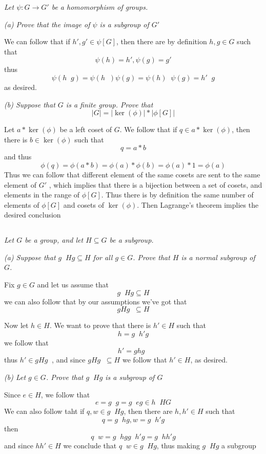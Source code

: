 \documentclass[11pt,oneside,titlepage]{book}
\DeclareMathOperator \inv {^{-1}}
\begin{document}
\textit{Let $\psi: G \to G'$ be a homomorphism of groups.}

\textit{(a) Prove that the image of $\psi$ is a subgroup of $G'$}

We can follow that if $h', g' \in \psi[G]$, then there are by
definition $h, g \in G$ such that
$$\psi(h) = h', \psi(g) = g'$$
thus
$$\psi(h\inv g) = \psi(h\inv) \psi(g) = \psi(h)\inv \psi(g) = h'\inv g$$
as desired.

\textit{(b) Suppose that $G$ is a finite group. Prove that
  $$|G| = |\ker(\phi)| * |\phi[G]|$$}

Let $a * \ker(\phi)$ be a left coset of $G$. We follow that if $q \in
a * \ker(\phi)$, then there is $b \in \ker(\phi)$ such that
$$q = a * b$$
and thus
$$\phi(q) = \phi(a * b) = \phi(a) * \phi(b) = \phi(a) * 1 = \phi(a)$$
Thus we can follow that different element of the same cosets are sent
to the same element of $G'$ , which implies that there is a bijection
between a set of cosets, and elements in the range of $\phi[G]$.
Thus there is by definition the same number of elements of $\phi[G]$
and cosets of $\ker(\phi)$. Then Lagrange's theorem implies the desired
conclusion

\subsection{}

\textit{Let $G$ be a group, and let $H \subseteq G$ be a subgroup.}

\textit{(a) Suppose that $g\inv H g \subseteq H$ for all $g \in G$.
  Prove that $H$ is a normal subgroup of $G$.}

Fix $g \in G$ and let us assume that
$$g\inv H g \subseteq H$$
we can also follow that by our assumptions we've got that
$$g H g\inv \subseteq H$$

Now let $h \in H$. We want to prove that there is $h' \in H$
such that
$$h = g\inv h' g$$
we follow that
$$h' = g h g\inv$$
thus $h' \in g H g\inv$, and since $g H g\inv \subseteq H$ we follow that
$h' \in H$, as desired.

\textit{(b) Let $g \in G$. Prove that $g\inv H g$ is a subgroup of $G$}

Since $e \in H$, we follow that
$$e = g\inv g = g\inv e g \in h\inv H G$$
We can also follow taht if $q, w \in g\inv H g$, then
there are $h, h' \in H$ such that
$$q = g\inv h g, w = g\inv h' g$$
then
$$q\inv w = g\inv h g g\inv h' g = g\inv h h' g$$
and since $h h' \in H$ we conclude that $q\inv w \in g\inv H g$, thus making
$g\inv H g$ a subgroup
\end{document}
